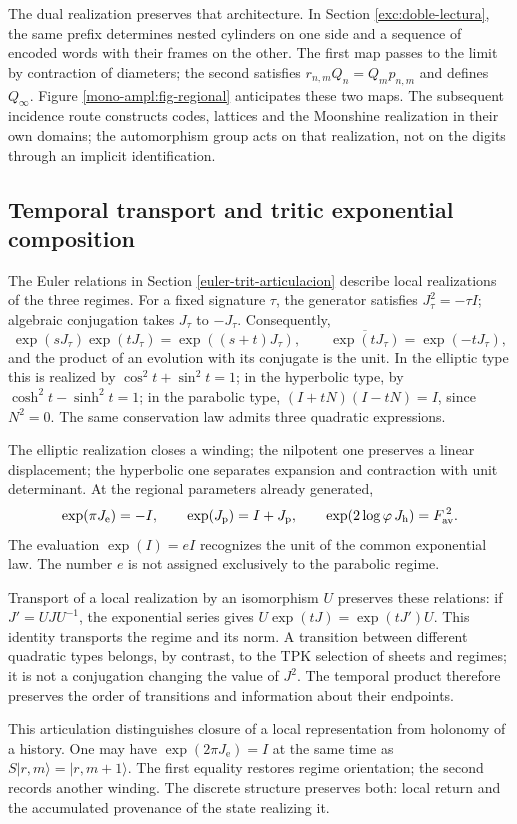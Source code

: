 The dual realization preserves that architecture. In Section
\ref{exc:doble-lectura}, the same prefix determines nested cylinders
on one side and a sequence of encoded words with their frames on the other.
The first map passes to the limit by contraction of diameters; the second
satisfies \(r_{n,m}Q_n=Q_mp_{n,m}\) and defines \(Q_\infty\).
Figure \ref{mono-ampl:fig-regional} anticipates these two maps.
The subsequent incidence route constructs codes, lattices and the
Moonshine realization in their own domains; the automorphism group
acts on that realization, not on the digits through an implicit
identification.





\subsection{Temporal transport and tritic exponential composition}
\label{mono-ampl:euler}

The Euler relations in Section \ref{euler-trit-articulacion}
describe local realizations of the three regimes. For a fixed
signature \(\tau\), the generator satisfies \(J_\tau^2=-\tau I\); algebraic
conjugation takes \(J_\tau\) to \(-J_\tau\). Consequently,
\[
 \exp(sJ_\tau)\exp(tJ_\tau)=\exp((s+t)J_\tau),\qquad
 \overline{\exp(tJ_\tau)}=\exp(-tJ_\tau),
\]
and the product of an evolution with its conjugate is the unit. In the
elliptic type this is realized by \(\cos^2t+\sin^2t=1\); in the hyperbolic type,
by \(\cosh^2t-\sinh^2t=1\); in the parabolic type,
\((I+tN)(I-tN)=I\), since \(N^2=0\). The same conservation law
admits three quadratic expressions.

The elliptic realization closes a winding; the nilpotent one preserves a
linear displacement; the hyperbolic one separates expansion and contraction with
unit determinant. At the regional parameters already generated,
\[
 \exp(\pi J_{\mathrm e})=-I,\qquad
 \exp(J_{\mathrm p})=I+J_{\mathrm p},\qquad
 \exp(2\log\varphi\,J_{\mathrm h})=F_{\rm av}^{\,2}.
\]
The evaluation \(\exp(I)=eI\) recognizes the unit of the common exponential
law. The number \(e\) is not assigned exclusively to the parabolic regime.

Transport of a local realization by an isomorphism \(U\) preserves
these relations: if \(J'=UJU^{-1}\), the exponential series gives
\(U\exp(tJ)=\exp(tJ')U\). This identity transports the regime and its
norm. A transition between different quadratic types belongs,
by contrast, to the TPK selection of sheets and regimes; it is not a conjugation
changing the value of \(J^2\). The temporal product therefore preserves the
order of transitions and information about their endpoints.

This articulation distinguishes closure of a local representation from
holonomy of a history. One may have \(\exp(2\pi J_{\mathrm e})=I\)
at the same time as \(S|r,m\rangle=|r,m+1\rangle\). The first equality
restores regime orientation; the second records another winding. The
discrete structure preserves both: local return and the accumulated provenance
of the state realizing it.
